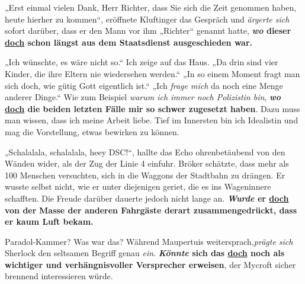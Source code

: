 \begin{exe}
	\ex\label{1063} 

	„Erst einmal vielen Dank, Herr Richter, dass Sie sich die Zeit genommen haben, heute hierher zu kommen“, eröffnete Kluftinger das Gespräch 		und \emph{ärgerte sich} sofort darüber, dass er den Mann vor ihm „Richter“ genannt hatte, \textbf{\textit{wo} dieser \ul{doch} schon 		längst aus dem Staatsdienst ausgeschieden war.}	
	\hfill\hbox{\citet[269]{Kluepfel2012}}
\end{exe}

\begin{exe}
	\ex\label{1064} 

	„Ich wünschte, es wäre nicht so.“ Ich zeige auf das Haus. „Da drin sind vier Kinder, die ihre Eltern nie wiedersehen werden.“
	„In so einem Moment fragt man sich doch, wie gütig Gott eigentlich ist.“
	„Ich \emph{frage mich} da noch eine Menge anderer Dinge.“ Wie zum Beispiel \emph{warum ich immer noch Polizistin bin}, \textbf{\textit{wo} 		\ul{doch} die beiden letzten Fälle mir so schwer zugesetzt haben}. Dazu muss man wissen, dass ich meine Arbeit liebe. Tief im Innersten bin ich 		Idealistin und mag die Vorstellung, etwas bewirken zu können.	
	\hfill\hbox{\citet[40]{Castillo2012}}
\end{exe}

\begin{exe}
	\ex\label{1065} 

	„Schalalala, schalalala, heey DSC!“, hallte das Echo ohrenbetäubend von den Wänden wider, als der Zug der Linie 4 einfuhr. Bröker schätzte, 		dass mehr als 100 Menschen versuchten, sich in die Waggons der Stadtbahn zu drängen. Er wusste selbst nicht, wie er unter diejenigen geriet, die es ins 	Wageninnere schafften. Die Freude darüber dauerte jedoch nicht lange an. \textbf{\textit{Wurde} er \ul{doch} von der} \textbf{Masse der anderen Fahrgäste 	derart zusammengedrückt, dass er kaum Luft bekam.}	
	\newline              		
	\hbox{}\hfill\hbox{\citet[7]{Glauche2014}}
\end{exe}

\begin{exe}
	\ex\label{1066} 

	Paradol-Kammer? Was war das? Während Maupertuis weitersprach,\linebreak \emph{prägte sich} Sherlock den seltsamen Begriff genau \emph{ein}. 							\textbf{\textit{Könnte} sich das \ul{doch} noch als wichtiger und verhängnisvoller Versprecher erweisen}, der Mycroft sicher brennend 				interessieren würde. 	
	\hfill\hbox{\citet[337]{Lane2014}}
\end{exe}

